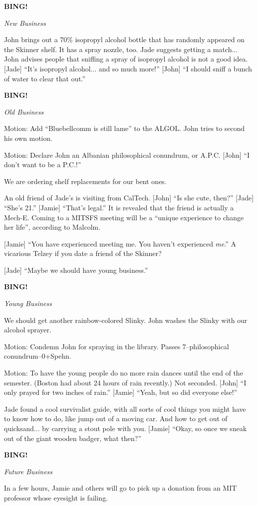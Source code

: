 \documentclass[12pt]{article}
\newcommand{\bing}{{\bf BING!} }
\newcommand{\goto}[1]{\bing \vskip 12pt \centerline{{\em{#1}}}}
\begin{document}
\goto{New Business}

John brings out a 70\% isopropyl alcohol bottle that has randomly
appeared on the Skinner shelf.  It has a spray nozzle, too.  Jade
suggests getting a match...  John advises people that sniffing a
spray of isopropyl alcohol is not a good idea.  [Jade] ``It's
isopropyl alcohol... and so much more!''  [John] ``I should sniff a
bunch of water to clear that out.''

\goto{Old Business}

Motion: Add ``Bluebellcomm is still lame'' to the ALGOL.  John tries
to second his own motion.

Motion: Declare John an Albanian philosophical conundrum, or A.P.C.
[John] ``I don't want to be a P.C.!''

We are ordering shelf replacements for our bent ones.

An old friend of Jade's is visiting from CalTech.  [John] ``Is she
cute, then?''  [Jade] ``She's 21.''  [Jamie] ``That's legal.''  It
is revealed that the friend is actually a Mech-E.  Coming to a MITSFS
meeting will be a ``unique experience to change her life'', according
to Malcolm.

[Jamie] ``You have experienced meeting me.  You haven't experienced
{\em me}.''  A vicarious Telzey if you date a friend of the Skinner?

[Jade] ``Maybe we should have young business.''

\goto{Young Business}

We should get another rainbow-colored Slinky.  John washes the Slinky
with our alcohol sprayer.

Motion: Condemn John for spraying in the library.  Passes
7--philosophical conundrum--0+Spehn.

Motion: To have the young people do no more rain dances until the
end of the semester.  (Boston had about 24 hours of rain recently.)
Not seconded.  [John] ``I only prayed for two inches of rain.''
[Jamie] ``Yeah, but so did everyone else!''

Jade found a cool survivalist guide, with all sorts of cool things
you might have to know how to do, like jump out of a moving car.
And how to get out of quicksand... by carrying a stout pole with you.
[Jamie] ``Okay, so once we sneak out of the giant wooden badger,
what then?''

\goto{Future Business}

In a few hours, Jamie and others will go to pick up a donation from
an MIT professor whose eyesight is failing.
\end{document}
